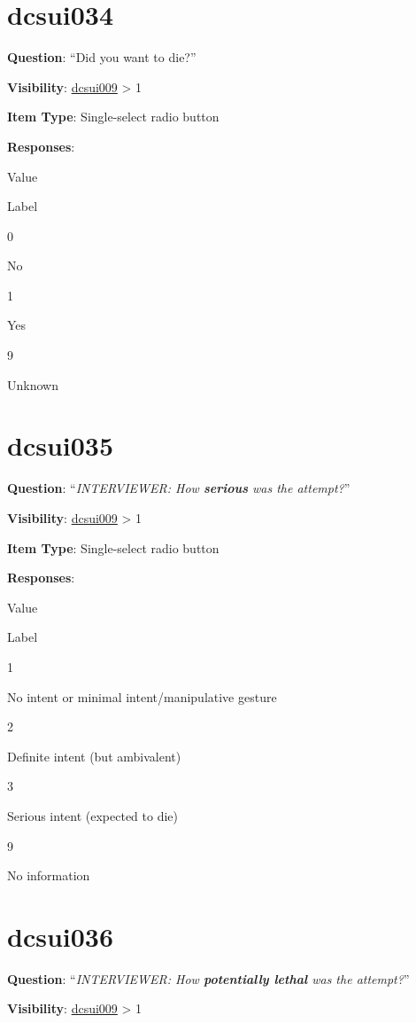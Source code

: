 \documentclass[]{book}
\begin{document}
\hypertarget{dcsui034}{%
\section{dcsui034}\label{dcsui034}}

\textbf{Question}: ``Did you want to die?''

\textbf{Visibility}: \protect\hyperlink{dcsui009}{dcsui009} \textgreater{} 1

\textbf{Item Type}: Single-select radio button

\textbf{Responses}:

Value

Label

0

No

1

Yes

9

Unknown

\hypertarget{dcsui035}{%
\section{dcsui035}\label{dcsui035}}

\textbf{Question}: ``\emph{INTERVIEWER: How \textbf{serious} was the attempt?}''

\textbf{Visibility}: \protect\hyperlink{dcsui009}{dcsui009} \textgreater{} 1

\textbf{Item Type}: Single-select radio button

\textbf{Responses}:

Value

Label

1

No intent or minimal intent/manipulative gesture

2

Definite intent (but ambivalent)

3

Serious intent (expected to die)

9

No information

\hypertarget{dcsui036}{%
\section{dcsui036}\label{dcsui036}}

\textbf{Question}: ``\emph{INTERVIEWER: How \textbf{potentially lethal} was the attempt?}''

\textbf{Visibility}: \protect\hyperlink{dcsui009}{dcsui009} \textgreater{} 1
\end{document}
